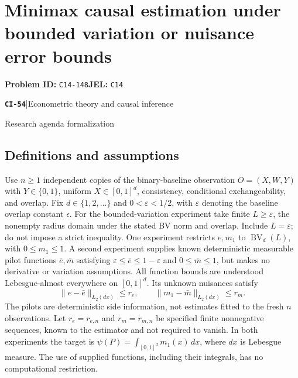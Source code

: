 \documentclass[11pt,a4paper]{article}
\newcommand{\entrymeta}[3]{{\sffamily\small\color{muted}\textbf{\texttt{#1}}\quad|\quad #2\par #3\par}}
\begin{document}
\section*{Minimax causal estimation under bounded variation or nuisance error bounds}
\textbf{Problem ID:} \texttt{C14-148}\quad \textbf{JEL:} \texttt{C14}\par
\label{problem:OP-0533}
\label{beyond:CI-54}
\entrymeta{CI-54}{Econometric theory and causal inference}{Research agenda formalization}
\subsection*{Definitions and assumptions}
Use $n\geq1$ independent copies of the binary-baseline observation $O=(X,W,Y)$ with $Y\in\{0,1\}$, uniform $X\in[0,1]^d$, consistency, conditional exchangeability, and overlap. Fix $d\in\{1,2,\ldots\}$ and $0<\varepsilon<1/2$, with $\varepsilon$ denoting the baseline overlap constant $\epsilon$. For the bounded-variation experiment take finite $L\geq\varepsilon$, the nonempty radius domain under the stated BV norm and overlap. Include $L=\varepsilon$; do not impose a strict inequality. One experiment restricts $e,m_1$ to $\operatorname{BV}_d(L)$, with $0\leq m_1\leq1$. A second experiment supplies known deterministic measurable pilot functions $\bar e,\bar m$ satisfying $\varepsilon\leq\bar e\leq1-\varepsilon$ and $0\leq\bar m\leq1$, but makes no derivative or variation assumptions. All function bounds are understood Lebesgue-almost everywhere on $[0,1]^d$. Its unknown nuisances satisfy
\[
 \|e-\bar e\|_{L_2(dx)}\leq r_e,\qquad
 \|m_1-\bar m\|_{L_2(dx)}\leq r_m.
\]
The pilots are deterministic side information, not estimates fitted to the fresh $n$ observations. Let $r_e=r_{e,n}$ and $r_m=r_{m,n}$ be specified finite nonnegative sequences, known to the estimator and not required to vanish. In both experiments the target is $\psi(P)=\int_{[0,1]^d} m_1(x)\,dx$, where $dx$ is Lebesgue measure. The use of supplied functions, including their integrals, has no computational restriction.
\end{document}
